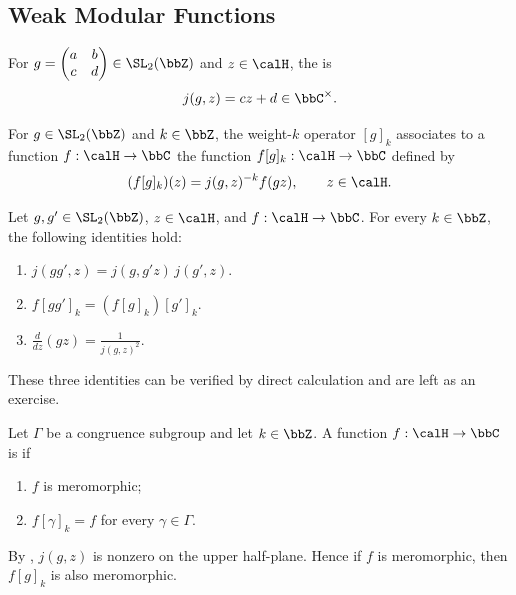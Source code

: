 \subsection{Weak Modular Functions}\label{Sec:MF_weak}
\begin{definition}\label{Def:MF_automorphy}
    For $g = \begin{pmatrix}a & b\\ c & d\end{pmatrix} \in \SL_2(\bbZ)$ and $z \in \calH$, the  is
    \[
        j(g, z) = cz + d \in \bbC^\times.
    \]
\end{definition}
\begin{definition}\label{Def:MF_slash}
    For $g \in \SL_2(\bbZ)$ and $k \in \bbZ$, the weight-$k$ operator $[g]_k$ associates to a function $f : \calH \to \bbC$ the function $f[g]_k : \calH \to \bbC$ defined by
    \[
        (f[g]_k)(z) = j(g, z)^{-k}f(gz), \qquad z \in \calH.
    \]
\end{definition}

\begin{lemma}\label{Lem:MF_slash}
    Let $g, g' \in \SL_2(\bbZ)$, $z \in \calH$, and $f : \calH \to \bbC$. For every $k \in \bbZ$, the following identities hold:
    \begin{enumerate}[label=(\arabic*)]
        \item $j(gg', z) = j(g, g'z)\,j(g', z)$.
        \item $f[gg']_k = (f[g]_k)[g']_k$.
        \item $\displaystyle\frac{d}{dz}(gz) = \frac{1}{j(g, z)^2}$.
    \end{enumerate}
\end{lemma}
These three identities can be verified by direct calculation and are left as an exercise.

\begin{definition}\label{Def:MF_weak}
    Let $\Gamma$ be a congruence subgroup and let $k \in \bbZ$. A function $f : \calH \to \bbC$ is  if
    \begin{enumerate}[label=(\arabic*)]
        \item $f$ is meromorphic;
        \item $f[\gamma]_k = f$ for every $\gamma \in \Gamma$.
    \end{enumerate}
\end{definition}
\begin{remarkstar}
    By , $j(g, z)$ is nonzero on the upper half-plane. Hence if $f$ is meromorphic, then $f[g]_k$ is also meromorphic.
\end{remarkstar}

